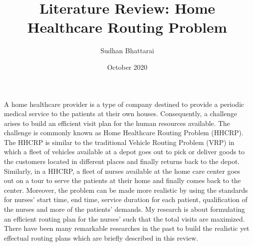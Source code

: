 \documentclass[12pt, letterpaper]{article}
\title {\textbf{\large Literature Review: Home Healthcare Routing Problem}}
\author {Sudhan Bhattarai}
\date {October 2020}
\begin{document}
\maketitle

A home healthcare provider is a type of company destined to provide a periodic medical service to the patients at their own houses. Consequently, a challenge arises to build an efficient visit plan for the human resources available. The challenge is commonly known as Home Healthcare Routing Problem (HHCRP). The HHCRP is similar to the traditional Vehicle Routing Problem (VRP) in which a fleet of vehicles available at a depot goes out to pick or deliver goods to the customers located in different places and finally returns back to the depot. Similarly, in a HHCRP, a fleet of nurses available at the home care center goes out on a tour to serve the patients at their home and finally comes back to the center. Moreover, the problem can be made more realistic by using the standards for nurses' start time, end time, service duration for each patient, qualification of the nurses and more of the patients' demands. My research is about formulating an efficient routing plan for the nurses' such that the total visits are maximized. There have been many remarkable researches in the past to build the realistic yet effectual routing plans which are briefly described in this review.
\end{document}
